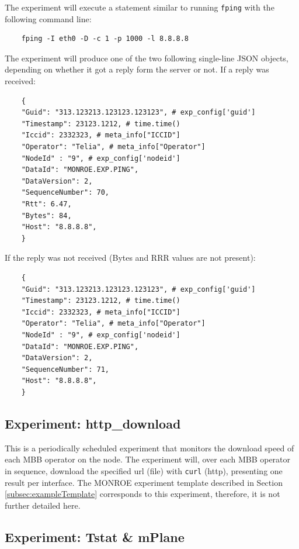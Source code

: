 \documentclass[a4paper,10pt]{article}
\newcommand{\VerbatimFont}{\footnotesize}
\newcommand{\monroe}{MONROE}
\newcommand{\identifier}[1]{{\texttt{\small{#1}}}}
\begin{document}
The experiment will execute a statement similar to running \identifier{fping} with the following command line:

{\VerbatimFont
	\begin{verbatim}
	fping -I eth0 -D -c 1 -p 1000 -l 8.8.8.8
	\end{verbatim}}

The experiment will produce one of the two following single-line JSON objects, depending on whether it got a reply form the server or not.
If a reply was received:

{\VerbatimFont
	\begin{verbatim}
	{
	"Guid": "313.123213.123123.123123", # exp_config['guid']
	"Timestamp": 23123.1212, # time.time()
	"Iccid": 2332323, # meta_info["ICCID"]
	"Operator": "Telia", # meta_info["Operator"]
	"NodeId" : "9", # exp_config['nodeid']
	"DataId": "MONROE.EXP.PING",
	"DataVersion": 2,
	"SequenceNumber": 70,
	"Rtt": 6.47,
	"Bytes": 84,
	"Host": "8.8.8.8",
	}
	\end{verbatim}}

If the reply was not received (Bytes and RRR values are not present):

{\VerbatimFont
	\begin{verbatim}
	{
	"Guid": "313.123213.123123.123123", # exp_config['guid']
	"Timestamp": 23123.1212, # time.time()
	"Iccid": 2332323, # meta_info["ICCID"]
	"Operator": "Telia", # meta_info["Operator"]
	"NodeId" : "9", # exp_config['nodeid']
	"DataId": "MONROE.EXP.PING",
	"DataVersion": 2,
	"SequenceNumber": 71,
	"Host": "8.8.8.8",
	}
	\end{verbatim}}


\subsection{Experiment: http\_download}

This is a periodically scheduled experiment that monitors the download speed of each MBB operator on the node.
The experiment will, over each MBB operator in sequence, download the specified url (file) with \identifier{curl} (http), presenting one result per interface.
The \monroe{} experiment template described in Section \ref{subsec:exampleTemplate} corresponds to this experiment, therefore, it is not further detailed here.


\subsection{Experiment: Tstat \& mPlane}
\end{document}
